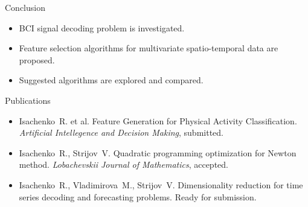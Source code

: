 \documentclass[9pt]{beamer}
\begin{document}
\begin{frame}{Conclusion}
	\begin{itemize}
		\item BCI signal decoding problem is investigated.
		\item Feature selection algorithms for multivariate spatio-temporal data are proposed.
		\item Suggested algorithms are explored and compared.
	\end{itemize}
	\begin{block}{Publications}
		\begin{itemize}
			\item Isachenko~R. et al. Feature Generation for Physical Activity Classification. \emph{Artificial Intellegence and Decision Making}, submitted.
			\item Isachenko~R., Strijov~V. Quadratic programming optimization for Newton method. \emph{Lobachevskii Journal of Mathematics}, accepted.
			\item Isachenko~R., Vladimirova~M., Strijov~V. Dimensionality reduction for time series decoding and forecasting problems. Ready for submission.
		\end{itemize}
	\end{block}
\end{frame}
\end{document}
